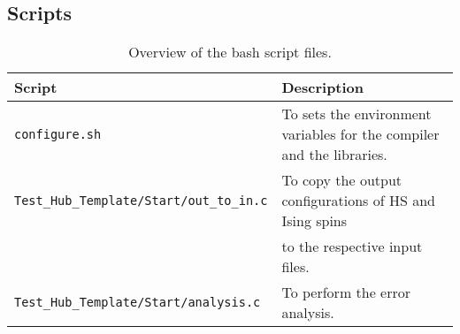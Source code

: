 \subsection{Scripts}\label{sec:scripts}
%
\begin{table}[h]
   \begin{tabular}{l l}
   Script & Description \\\hline
   \texttt{configure.sh} & To sets the environment variables for the compiler and the libraries.\\
   \texttt{Test\_Hub\_Template/Start/out\_to\_in.c} & To copy the output configurations of HS and Ising spins\\
   & to the respective input files. \\
   \texttt{Test\_Hub\_Template/Start/analysis.c} & To perform the error analysis.
   \end{tabular}
   \caption{Overview of the bash script files. \label{table:scripts}}
\end{table}
%